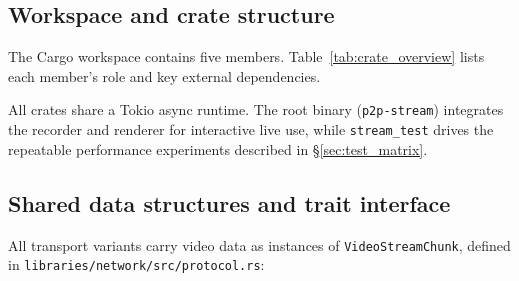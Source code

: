\subsection{Workspace and crate structure}
The Cargo workspace contains five members. Table~\ref{tab:crate_overview} lists each member's role and key external dependencies.

\begin{table}[htbp]
    \centering
    \caption{Workspace crate overview. Source: author.}
    \label{tab:crate_overview}
\end{table}

All crates share a Tokio async runtime. The root binary (\texttt{p2p-stream}) integrates the recorder and renderer for interactive live use, while \texttt{stream\_test} drives the repeatable performance experiments described in \S\ref{sec:test_matrix}.

\subsection{Shared data structures and trait interface}
\label{sec:chunk_trait}
All transport variants carry video data as instances of \texttt{VideoStreamChunk}, defined in \texttt{libraries/network/src/protocol.rs}:

